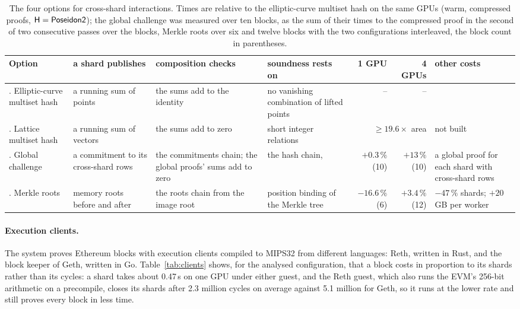 \begin{table}[t]
\centering
\footnotesize
\caption{The four options for cross-shard interactions. Times are relative to the elliptic-curve multiset hash on the same GPUs (warm, compressed proofs, $\mathsf{H} = \mathsf{Poseidon2}{}$); the global challenge was measured over ten blocks, as the sum of their times to the compressed proof in the second of two consecutive passes over the blocks, Merkle roots over six and twelve blocks with the two configurations interleaved, the block count in parentheses.}
\label{tab:pq}
\setlength{\tabcolsep}{3pt}\begin{tabular}{@{}>{\raggedright\arraybackslash}p{}>{\raggedright\arraybackslash}p{}>{\raggedright\arraybackslash}p{}>{\raggedright\arraybackslash}p{}rr>{\raggedright\arraybackslash}p{}@{}}
\toprule
Option & a shard publishes & composition checks & soundness rests on & 1 GPU & 4 GPUs & other costs \\
\midrule
1. Elliptic-curve multiset hash & a running sum of points & the sums add to the identity & no vanishing combination of lifted points & -- & -- & \\
2. Lattice multiset hash & a running sum of vectors & the sums add to zero & short integer relations & \multicolumn{2}{r}{$\ge 19.6\times$ area} & not built \\
3. Global challenge & a commitment to its cross-shard rows & the commitments chain; the global proofs' sums add to zero & the hash chain, \LogUp{} & $+0.3\,\%$ (10) & $+13\,\%$ (10) & a global proof for each shard with cross-shard rows \\
4. Merkle roots & memory roots before and after & the roots chain from the image root & position binding of the Merkle tree & $-16.6\,\%$ (6) & $+3.4\,\%$ (12) & $-47\,\%$ shards; $+20$\,GB per worker \\
\bottomrule
\end{tabular}
\end{table}

\paragraph{Execution clients.}\label{sec:perf-eight}\label{sec:perf-clients} The system proves Ethereum blocks with execution clients compiled to MIPS32 from different languages: Reth, written in Rust, and the block keeper of Geth, written in Go. Table~\ref{tab:clients} shows, for the analysed configuration, that a block costs in proportion to its shards rather than its cycles: a shard takes about 0.47\,s on one GPU under either guest, and the Reth guest, which also runs the EVM's 256-bit arithmetic on a precompile, closes its shards after 2.3 million cycles on average against 5.1 million for Geth, so it runs at the lower rate and still proves every block in less time.

